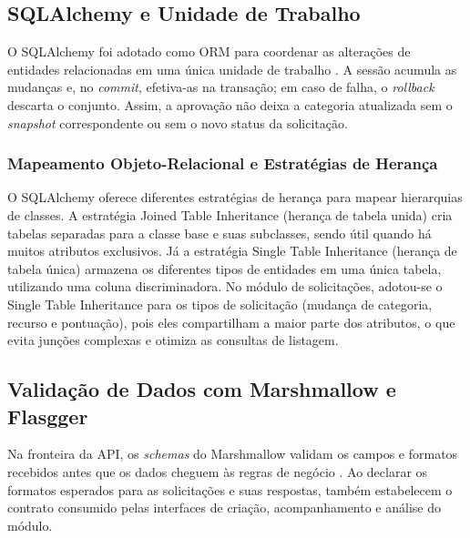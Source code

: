 

\subsection{SQLAlchemy e Unidade de Trabalho}
\label{subsec:sqlalchemy-unidade-trabalho}

O SQLAlchemy foi adotado como ORM para coordenar as alterações de entidades relacionadas em uma
única unidade de trabalho \cite{bayer2012}. A sessão acumula as mudanças e, no \textit{commit},
efetiva-as na transação; em caso de falha, o \textit{rollback} descarta o conjunto. Assim, a
aprovação não deixa a categoria atualizada sem o \textit{snapshot} correspondente ou sem o novo
status da solicitação.

 

\subsubsection{Mapeamento Objeto-Relacional e Estratégias de Herança}
\label{subsubsec:mapeamento-objeto-relacional-estrategias-heranca}

O SQLAlchemy oferece diferentes estratégias de herança para mapear hierarquias de classes. A
estratégia Joined Table Inheritance (herança de tabela unida) cria tabelas separadas para a
classe base e suas subclasses, sendo útil quando há muitos atributos exclusivos. Já a estratégia
Single Table Inheritance (herança de tabela única) armazena os diferentes tipos de entidades em
uma única tabela, utilizando uma coluna discriminadora. No módulo de solicitações, adotou-se o
Single Table Inheritance para os tipos de solicitação (mudança de categoria, recurso e
pontuação), pois eles compartilham a maior parte dos atributos, o que evita junções complexas e
otimiza as consultas de listagem.

\subsection{Validação de Dados com Marshmallow e Flasgger}
\label{subsec:validacao-dados-marshmallow-flasgger}

Na fronteira da API, os \textit{schemas} do Marshmallow validam os campos e formatos recebidos
antes que os dados cheguem às regras de negócio \cite{marshmallow2024}. Ao declarar os formatos
esperados para as solicitações e suas respostas, também estabelecem o contrato consumido pelas
interfaces de criação, acompanhamento e análise do módulo.
